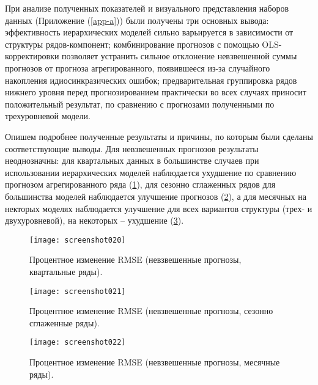 \documentclass[12pt,a4paper, oneside]{extreport}
\begin{document}
При анализе  полученных показателей  и визуального  представления  наборов данных (Приложение (\ref{app-a}))  были получены три основных  вывода:
эффективность иерархических  моделей  сильно варьируется в зависимости от структуры рядов-компонент;
комбинирование прогнозов с помощью OLS-корректировки  позволяет устранить сильное отклонение невзвешенной суммы прогнозов от прогноза агрегированного, появившееся из-за случайного накопления идиосинкразических ошибок;
предварительная группировка рядов нижнего уровня перед прогнозированием практически во всех случаях приносит положительный результат, по сравнению с прогнозами полученными по трехуровневой модели. 






Опишем подробнее полученные результаты и причины, по которым были сделаны соответствующие выводы.
Для невзвешенных прогнозов результаты неоднозначны: для квартальных данных в большинстве случаев при использовании иерархических моделей наблюдается ухудшение  по сравнению прогнозом агрегированного ряда (\ref{fig111}), для сезонно сглаженных рядов для большинства моделей наблюдается улучшение прогнозов (\ref{fig222}), а для месячных на некторых моделях наблюдается улучшение для всех вариантов структуры (трех- и двухуровневой),   на некоторых -- ухудшение (\ref{fig333}).
 
 
\begin{figure}
	\centering
	\texttt{[image: screenshot020]}
	\caption{Процентное изменение RMSE (невзвешенные прогнозы, квартальные ряды).
	}
	\label{fig111}
\end{figure}
 
\begin{figure}
	\centering
	\texttt{[image: screenshot021]}
	\caption{Процентное изменение RMSE (невзвешенные прогнозы, сезонно сглаженные  ряды).
	}
	\label{fig222}
\end{figure}

 
\begin{figure}
	\centering
	\texttt{[image: screenshot022]}
	\caption{Процентное изменение RMSE (невзвешенные прогнозы, месячные ряды).
	}
	\label{fig333}
\end{figure}

 
 
\end{document}
